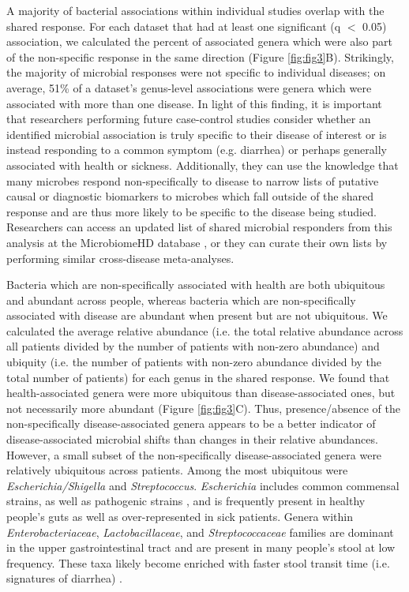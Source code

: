 \documentclass{article}
\begin{document}
A majority of bacterial associations within individual studies overlap with the shared response.
For each dataset that had at least one significant (q $<$ 0.05) association, we calculated the percent of associated genera which were also part of the non-specific response in the same direction (Figure \ref{fig:fig3}B).
Strikingly, the majority of microbial responses were not specific to individual diseases; on average, 51\% of a dataset's genus-level associations were genera which were associated with more than one disease.
In light of this finding, it is important that researchers performing future case-control studies consider whether an identified microbial association is truly specific to their disease of interest or is instead responding to a common symptom (e.g. diarrhea) or perhaps generally associated with health or sickness.
Additionally, they can use the knowledge that many microbes respond non-specifically to disease to narrow lists of putative causal or diagnostic biomarkers to microbes which fall outside of the shared response and are thus more likely to be specific to the disease being studied.
Researchers can access an updated list of shared microbial responders from this analysis at the MicrobiomeHD database \cite{microbiomehd}, or they can curate their own lists by performing similar cross-disease meta-analyses.

Bacteria which are non-specifically associated with health are both ubiquitous and abundant across people, whereas bacteria which are non-specifically associated with disease are abundant when present but are not ubiquitous.
We calculated the average relative abundance (i.e. the total relative abundance across all patients divided by the number of patients with non-zero abundance) and ubiquity (i.e. the number of patients with non-zero abundance divided by the total number of patients) for each genus in the shared response.
We found that health-associated genera were more ubiquitous than disease-associated ones, but not necessarily more abundant (Figure \ref{fig:fig3}C).
Thus, presence/absence of the non-specifically disease-associated genera appears to be a better indicator of disease-associated microbial shifts than changes in their relative abundances.
However, a small subset of the non-specifically disease-associated genera were relatively ubiquitous across patients.
Among the most ubiquitous were \textit{Escherichia/Shigella} and \textit{Streptococcus}.
\textit{Escherichia} includes common commensal strains, as well as pathogenic strains \cite{rasko2008pangenome}, and is frequently present in healthy people's guts as well as over-represented in sick patients. Genera within \textit{Enterobacteriaceae}, \textit{Lactobacillaceae}, and \textit{Streptococcaceae} families are dominant in the upper gastrointestinal tract \cite{donaldson2016gut,wang2013upper} and are present in many people's stool at low frequency. These taxa likely become enriched with faster stool transit time (i.e. signatures of diarrhea) \cite{donaldson2016gut,savage1977microbial}.
\end{document}
